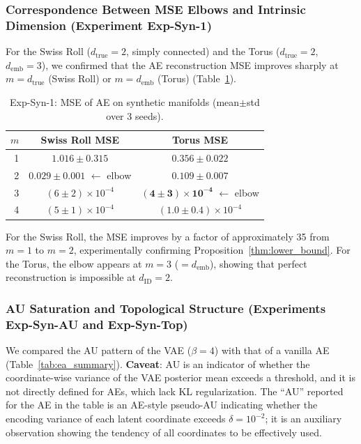 \documentclass[make,article,submit,pdftex,moreauthors]{Definitions/mdpi}
\newcommand{\dID}{d_{\mathrm{ID}}}
\newcommand{\dtrue}{d_{\mathrm{true}}}
\newcommand{\demb}{d_{\mathrm{emb}}}
\begin{document}
\subsubsection{Correspondence Between MSE Elbows and Intrinsic Dimension (Experiment Exp-Syn-1)}

For the Swiss Roll ($\dtrue = 2$, simply connected) and the Torus ($\dtrue = 2$, $\demb = 3$),
we confirmed that the AE reconstruction MSE improves sharply at $m = \dtrue$ (Swiss Roll) or $m = \demb$ (Torus)
(Table~\ref{tab:e1}).

\begin{table}[H]
\centering
\caption{Exp-Syn-1: MSE of AE on synthetic manifolds (mean$\pm$std over 3 seeds).}
\label{tab:e1}
\small
\begin{tabular}{rcc}
\toprule
$m$ & Swiss Roll MSE & Torus MSE \\
\midrule
1 & $1.016\pm0.315$ & $0.356\pm0.022$ \\
2 & $\boldsymbol{0.029\pm0.001}$ $\leftarrow$ elbow & $0.109\pm0.007$ \\
3 & $(6\pm2)\times10^{-4}$ & $\boldsymbol{(4\pm3)\times10^{-4}}$ $\leftarrow$ elbow \\
4 & $(5\pm1)\times10^{-4}$ & $(1.0\pm0.4)\times10^{-4}$ \\
\bottomrule
\end{tabular}
\end{table}

For the Swiss Roll, the MSE improves by a factor of approximately 35 from $m = 1$ to $m = 2$,
experimentally confirming Proposition~\ref{thm:lower_bound}.
For the Torus, the elbow appears at $m = 3$ ($= \demb$),
showing that perfect reconstruction is impossible at $\dID = 2$.

\subsubsection{AU Saturation and Topological Structure (Experiments Exp-Syn-AU and Exp-Syn-Top)}

We compared the AU pattern of the VAE ($\beta = 4$) with that of a vanilla AE (Table~\ref{tab:ea_summary}).
\textbf{Caveat}: AU is an indicator of whether the coordinate-wise variance of the VAE posterior mean exceeds a threshold,
and it is not directly defined for AEs, which lack KL regularization.
The ``AU'' reported for the AE in the table is an AE-style pseudo-AU indicating whether
the encoding variance of each latent coordinate exceeds $\delta = 10^{-2}$;
it is an auxiliary observation showing the tendency of all coordinates to be effectively used.
\end{document}
